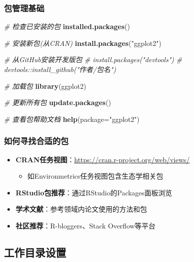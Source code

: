 \documentclass[
  twoside]{book}
\newenvironment{Shaded}{\begin{snugshade}}{\end{snugshade}}
\newcommand{\AttributeTok}[1]{\textcolor[rgb]{0.13,0.29,0.53}{#1}}
\newcommand{\CommentTok}[1]{\textcolor[rgb]{0.56,0.35,0.01}{\textit{#1}}}
\newcommand{\FunctionTok}[1]{\textcolor[rgb]{0.13,0.29,0.53}{\textbf{#1}}}
\newcommand{\NormalTok}[1]{#1}
\newcommand{\StringTok}[1]{\textcolor[rgb]{0.31,0.60,0.02}{#1}}
\providecommand{\tightlist}{%
  \setlength{\itemsep}{0pt}\setlength{\parskip}{0pt}}
\begin{document}
\hypertarget{ux5305ux7ba1ux7406ux57faux7840}{%
\subsubsection{包管理基础}\label{ux5305ux7ba1ux7406ux57faux7840}}

\begin{Shaded}
\begin{Highlighting}[]
\CommentTok{\# 检查已安装的包}
\FunctionTok{installed.packages}\NormalTok{()}

\CommentTok{\# 安装新包(从CRAN)}
\FunctionTok{install.packages}\NormalTok{(}\StringTok{"ggplot2"}\NormalTok{) }

\CommentTok{\# 从GitHub安装开发版包}
\CommentTok{\# install.packages("devtools")}
\CommentTok{\# devtools::install\_github("作者/包名")}

\CommentTok{\# 加载包}
\FunctionTok{library}\NormalTok{(ggplot2)}

\CommentTok{\# 更新所有包}
\FunctionTok{update.packages}\NormalTok{()}

\CommentTok{\# 查看包帮助文档}
\FunctionTok{help}\NormalTok{(}\AttributeTok{package=}\StringTok{"ggplot2"}\NormalTok{)}
\end{Highlighting}
\end{Shaded}

\hypertarget{ux5982ux4f55ux5bfbux627eux5408ux9002ux7684ux5305}{%
\subsubsection{如何寻找合适的包}\label{ux5982ux4f55ux5bfbux627eux5408ux9002ux7684ux5305}}

\begin{itemize}
\tightlist
\item
  \textbf{CRAN任务视图}：\url{https://cran.r-project.org/web/views/}

  \begin{itemize}
  \tightlist
  \item
    如Environmetrics任务视图包含生态学相关包
  \end{itemize}
\item
  \textbf{RStudio包推荐}：通过RStudio的Packages面板浏览
\item
  \textbf{学术文献}：参考领域内论文使用的方法和包
\item
  \textbf{社区推荐}：R-bloggers、Stack Overflow等平台
\end{itemize}

\hypertarget{ux5de5ux4f5cux76eeux5f55ux8bbeux7f6e}{%
\subsection{工作目录设置}\label{ux5de5ux4f5cux76eeux5f55ux8bbeux7f6e}}
\end{document}
